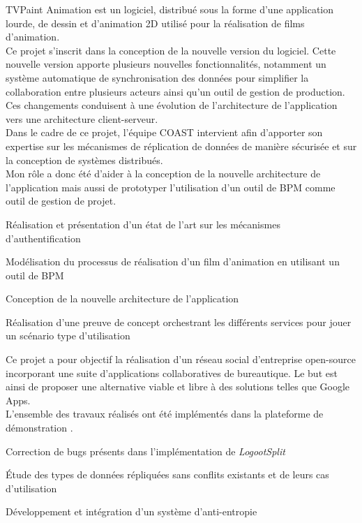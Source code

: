 \documentclass[]{deedy-resume-openfont}
\begin{document}
TVPaint Animation est un logiciel, distribué sous la forme d'une application lourde, de dessin et d'animation 2D utilisé pour la réalisation de films d'animation.
\\
Ce projet s'inscrit dans la conception de la nouvelle version du logiciel.
Cette nouvelle version apporte plusieurs nouvelles fonctionnalités,
notamment un système automatique de synchronisation des données pour simplifier la collaboration entre plusieurs acteurs
ainsi qu'un outil de gestion de production.
Ces changements conduisent à une évolution de l'architecture de l'application vers une architecture client-serveur.
\\
Dans le cadre de ce projet, l'équipe COAST intervient afin d'apporter son expertise sur les mécanismes de réplication de données de manière sécurisée
et sur la conception de systèmes distribués.
\\
Mon rôle a donc été d'aider à la conception de la nouvelle architecture de l'application
mais aussi de prototyper l'utilisation d'un outil de BPM comme outil de gestion de projet.
\begin{tightemize}
\item Réalisation et présentation d'un état de l'art sur les mécanismes d'authentification
\item Modélisation du processus de réalisation d'un film d'animation en utilisant un outil de BPM
\item Conception de la nouvelle architecture de l'application
\item Réalisation d'une preuve de concept orchestrant les différents services pour jouer un scénario type d'utilisation
\end{tightemize}
\sectionsep

Ce projet a pour objectif la réalisation d'un réseau social d'entreprise open-source
incorporant une suite d'applications collaboratives de bureautique.
Le but est ainsi de proposer une alternative viable et libre
à des solutions telles que Google Apps.
\\
L'ensemble des travaux réalisés ont été implémentés dans la plateforme de démonstration
\href{https://www.coedit.re}{}.
\begin{tightemize}
\item Correction de bugs présents dans l'implémentation de \emph{LogootSplit}
\item Étude des types de données répliquées sans conflits existants et de leurs cas d'utilisation
\item Développement et intégration d'un système d'anti-entropie
\end{tightemize}
\sectionsep
\end{document}
